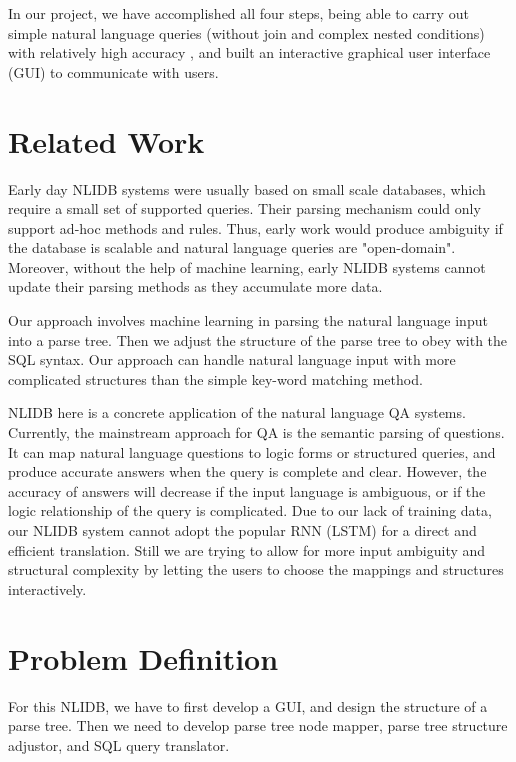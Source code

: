 \documentclass[twocolumn]{article}
\begin{document}
In our project, we have accomplished all four steps, being able to carry out simple natural language queries (without join and complex nested conditions) with relatively high accuracy , and built an interactive graphical user interface (GUI) to communicate with users.

\section{Related Work}

Early day NLIDB systems were usually based on small scale databases, which require a small set of supported queries. Their parsing mechanism could only support ad-hoc methods and rules. Thus, early work would produce ambiguity if the database is scalable and natural language queries are "open-domain". Moreover, without the help of machine learning, early NLIDB systems cannot update their parsing methods as they accumulate more data.\cite{QATutorial}

Our approach involves machine learning in parsing the natural language input into a parse tree. Then we adjust the structure of the parse tree to obey with the SQL syntax. Our approach can handle natural language input with more complicated structures than the simple key-word matching method. 

NLIDB here is a concrete application of the natural language QA systems.\cite{QATutorial} Currently, the mainstream approach for QA is the semantic parsing of questions. It can map natural language questions to logic forms or structured queries, and produce accurate answers when the query is complete and clear. However, the accuracy of answers will decrease if the input language is ambiguous, or if the logic relationship of the query is complicated. Due to our lack of training data, our NLIDB system cannot adopt the popular RNN (LSTM) for a direct and efficient translation. Still we are trying to allow for more input ambiguity and structural complexity by letting the users to choose the mappings and structures interactively.

\section{Problem Definition}

For this NLIDB, we have to first develop a GUI, and design the structure of a parse tree. Then we need to develop parse tree node mapper, parse tree structure adjustor, and SQL query translator.
\end{document}

